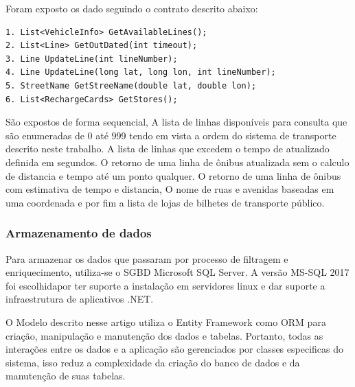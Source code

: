\documentclass[12pt]{article}
\begin{document}
Foram exposto os dado seguindo o contrato descrito abaixo:
\begin{lstlisting}
1. List<VehicleInfo> GetAvailableLines();
2. List<Line> GetOutDated(int timeout);
3. Line UpdateLine(int lineNumber);
4. Line UpdateLine(long lat, long lon, int lineNumber);
5. StreetName GetStreeName(double lat, double lon);
6. List<RechargeCards> GetStores();
\end{lstlisting}

São expostos de forma sequencial, A lista de linhas disponíveis para consulta que são enumeradas de 0 até 999 tendo em vista a ordem do sistema de transporte descrito neste trabalho. A lista de linhas que excedem o tempo de atualizado definida em segundos. O retorno de uma linha de ônibus atualizada sem o calculo de distancia e tempo até um ponto qualquer. O retorno de uma linha de ônibus com estimativa de tempo e distancia, O nome de ruas e avenidas baseadas em uma coordenada e por fim a lista de lojas de bilhetes de transporte público.
\subsubsection{Armazenamento de dados} \label{sec:ADONET}
Para armazenar os dados que passaram por processo de filtragem e enriquecimento, utiliza-se o SGBD Microsoft SQL Server. A versão MS-SQL 2017 foi escolhidapor ter suporte a instalação em servidores linux e dar suporte a infraestrutura de aplicativos .NET.

O Modelo descrito nesse artigo utiliza o Entity Framework como ORM para criação, manipulação e manutenção dos dados e tabelas. Portanto, todas as interações entre os dados e a aplicação são gerenciados por classes especificas do sistema, isso reduz a complexidade da criação do banco de dados e da manutenção de suas tabelas.
\end{document}
